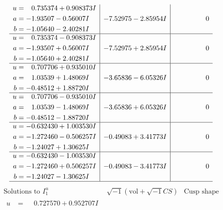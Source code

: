 \documentclass[1p]{elsarticle_modified}
\theoremstyle{definition}
\newcommand{\I}{\sqrt{-1}}
\begin{document}
$$\begin{array}{c|c|c}
\begin{aligned}
u &= \phantom{-}0.735374 + 0.908373 I \\
a &= -1.93507 - 0.56007 I \\
b &= -1.05640 - 2.40281 I\end{aligned}
 & -7.52975 - 2.85954 I & \phantom{-0.000000 } 0 \\ \hline\begin{aligned}
u &= \phantom{-}0.735374 - 0.908373 I \\
a &= -1.93507 + 0.56007 I \\
b &= -1.05640 + 2.40281 I\end{aligned}
 & -7.52975 + 2.85954 I & \phantom{-0.000000 } 0 \\ \hline\begin{aligned}
u &= \phantom{-}0.707706 + 0.935010 I \\
a &= \phantom{-}1.03539 + 1.48069 I \\
b &= -0.48512 + 1.88720 I\end{aligned}
 & -3.65836 - 6.05326 I & \phantom{-0.000000 } 0 \\ \hline\begin{aligned}
u &= \phantom{-}0.707706 - 0.935010 I \\
a &= \phantom{-}1.03539 - 1.48069 I \\
b &= -0.48512 - 1.88720 I\end{aligned}
 & -3.65836 + 6.05326 I & \phantom{-0.000000 } 0 \\ \hline\begin{aligned}
u &= -0.632430 + 1.003530 I \\
a &= -1.272460 - 0.506257 I \\
b &= -1.24027 + 1.30625 I\end{aligned}
 & -0.49083 + 3.41773 I & \phantom{-0.000000 } 0 \\ \hline\begin{aligned}
u &= -0.632430 - 1.003530 I \\
a &= -1.272460 + 0.506257 I \\
b &= -1.24027 - 1.30625 I\end{aligned}
 & -0.49083 - 3.41773 I & \phantom{-0.000000 } 0\\
 \hline 
 \end{array}$$\newpage$$\begin{array}{c|c|c}  
\text{Solutions to }I^u_{1}& \I (\text{vol} + \sqrt{-1}CS) & \text{Cusp shape}\\
 \hline 
\begin{aligned}
u &= \phantom{-}0.727570 + 0.952707 I \\

\end{aligned}
\end{array}$$
\end{document}

